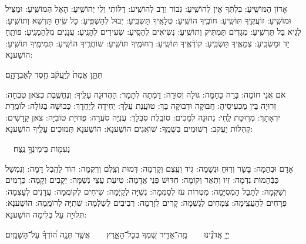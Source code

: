 \documentclass[twoside, openany, parskip=half, 11pt]{book}
\begin{document}

אָדוֹן הַמּוֹשִֽׁיעַ: בִּלְתְּֿךָ אֵין לְהוֹשִֽׁיעַ: גִּבּוֹר וְרַב לְהוֹשִֽׁיע: דַּלּוֹתִי וְלִי יְהוֹשִֽׁיעַ: הָאֵל הַמּוֹשִֽׁיעַ: וּמַצִּיל וּמוֹשִֽׁיעַ: זוֹעֲקֶֽיךָ תּוֹשִֽׁיעַ: חוֹכֶֽיךָ הוֹשִֽׁיעַ: טְלָאֶֽיךָ תַּשְׂבִּֽיעַ: יְבוּל לְהַשְׁפִּֽיעַ: כָּל שִֽׂיחַ תַּדְשֵׁא וְתוֹשִֽׁיעַ: לְגֵיא בַּל תַּרְשִֽׁיעַ: מְגָדִים תַּמְתִּיק וְתוֹשִֽׁיעַ: נְשִׂיאִים לְהַסִּֽיעַ: שְׂעִירִים לְהָנִֽיעַ: עֲנָנִים מִלְּֿהַמְנִֽיעַ: פּוֹתֵֽחַ יָד וּמַשְׂבִּֽיעַ: צְמֵאֶֽיךָ תַּשְׂבִּֽיעַ: קוֹרְֿאֶֽיךָ תּוֹשִֽׁיעַ: רְחוּמֶֽיךָ תּוֹשִֽׁיעַ:
שׁוֹחֲרֶֽיךָ הוֹשִֽׁיעַ: 
תְּמִימֶֽיךָ תּוֹשִֽׁיעַ: הוֹשַׁענָא:

 תִּתֵּ֤ן  אֱמֶת֙ לְיַֽעֲקֹ֔ב חֶ֖סֶד לְאַבְרָהָ֑ם׃


אֹם אֲנִי חוֹמָה: בָּרָה כַּחַמָּה: גּוֹלָה וְסוּרָה: דָּמְֿתָה לְתָמָר: הַהֲרוּגָה עָלֶֽיךָ: וְנֶחֱשֶֽׁבֶת כְּצֹאן טִבְחָה: זְרוּיָה בֵּין מַכְעִיסֶֽיהָ: חֲבוּקָה וּדְבוּקָה בָּךְ: טוֹעֶֽנֶת עֻלָּךְ: יְחִידָה לְיַחֲדָךְ: כְּבוּשָׁה בַּגּוֹלָה: לוֹמֶֽדֶת יִרְאָתָךְ: מְרֽוּטַת לֶֽחִי: נְתוּנָה לְמַכִים: סוֹבֶֽלֶת סִבְלָךְ: עֲנִיָּה סֹעֲרָה: פְּדוּיַת טוֹבִיָּה: צֹאן קָדָשִׁים: קְהִלּוֹת יַעֲקֹב: רְשׁוּמִים בִּשְׁמֶֽךָ: שׁוֹאֲגִים הוֹשַׁענָא: הוֹשַׁענָא תְּמוּכִים עָלֶֽיךָ הוֹשַׁענָא:

 נְעִמ֖וֹת  בִּימִינְֿךָ֣ נֶֽצַח׃


אָדָם וּבְהֵמָה: בָּשָׂר וְרֽוּחַ וּנְשָׁמָה: גִּיד וְעֶֽצֶם וְקָרְמָה: דְּמוּת וְצֶֽלֶם וְרִקְמָה: הוֹד לַהֶֽבֶל דָּמָה: וְנִמְשַׁל כַּבְּֿהֵמוֹת נִדְמָה: זִיו וְתֹֽאַר וְקוֹמָה: חִדּוּשׁ פְּנֵי אֲדָמָה: טִיעַת עֲצֵי נְשַׁמָּה: יְקָבִים וְקָמָה: כְּרָמִים וְשִׁקְמָה: לְתֵבֵל הַמְֿסֻיָּמָה: מִטְרוֹת עֹז לְסַמְּמָה: נְשִׁיָּה לְקַיְּֿמָה: שִׂיחִים לְקוֹמֲמָה: עֲדָנִים לְעָצְמָה: פְּרָחִים לְהַעֲצִֽימָה: צְמָחִים לְגָשְׁמָה: קָרִים לְזָרְמָה: רְבִיבִים לְשַׁלְּֿמָה:
שְׁתִיָּה לְרוֹמֵֽמָה: הוֹשַׁענָא:
תְּלוּיָה עַל בְּלִימָה הוֹשַׁענָא:

 יְיָ֤  אֲדֹנֵ֗ינוּ  מָֽה־אַדִּ֣יר שִׁ֭מְךָ בְּכָל־הָאָ֑רֶץ  אֲשֶׁ֥ר תְּנָ֥ה ה֝וֹדְךָ֗ עַל־הַשָּׁמָֽיִם׃
\end{document}
